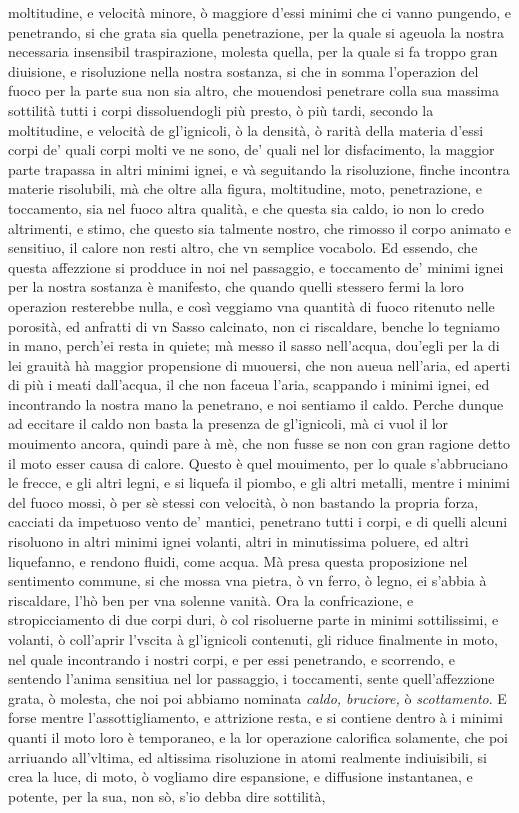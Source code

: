 \documentclass[11pt,twoside,openany]{book}
\begin{document}
moltitudine, e velocità minore, ò maggiore d'essi minimi che ci vanno pungendo, e penetrando, si che grata sia quella penetrazione, per la quale si ageuola la nostra necessaria insensibil traspirazione, molesta quella, per la quale si fa troppo gran diuisione, e risoluzione nella nostra sostanza, si che in somma l'operazion del fuoco per la parte sua non sia altro, che mouendosi penetrare colla sua massima sottilità tutti i corpi dissoluendogli più presto, ò più tardi, secondo la moltitudine, e velocità de gl'ignicoli, ò la densità, ò rarità della materia d'essi corpi de' quali corpi molti ve ne sono, de' quali nel lor disfacimento, la maggior parte trapassa in altri minimi ignei, e và seguitando la risoluzione, finche incontra materie risolubili, mà che oltre alla figura, moltitudine, moto, penetrazione, e toccamento, sia nel fuoco altra qualità, e che questa sia caldo, io non lo credo altrimenti, e stimo, che questo sia talmente nostro, che rimosso il corpo animato e sensitiuo, il calore non resti altro, che vn semplice vocabolo. Ed essendo, che questa affezzione si prodduce in noi nel passaggio, e toccamento de' minimi ignei per la nostra sostanza è manifesto, che quando quelli stessero fermi la loro operazion resterebbe nulla, e così veggiamo vna quantità di fuoco ritenuto nelle porosità, ed anfratti di vn Sasso calcinato, non ci riscaldare, benche lo tegniamo in mano, perch'ei resta in quiete; mà messo il sasso nell'acqua, dou'egli per la di lei grauità hà maggior propensione di muouersi, che non aueua nell'aria, ed aperti di più i meati dall'acqua, il che non faceua l'aria, scappando i minimi ignei, ed incontrando la nostra mano la penetrano, e noi sentiamo il caldo. Perche dunque ad eccitare il caldo non basta la presenza de gl'ignicoli, mà ci vuol il lor mouimento ancora, quindi pare à mè, che non fusse se non con gran ragione detto il moto esser causa di calore. Questo è quel mouimento, per lo quale s'abbruciano le frecce, e gli altri legni, e si liquefa il piombo, e gli altri metalli, mentre i minimi del fuoco mossi, ò per sè stessi con velocità, ò non bastando la propria forza, cacciati da impetuoso vento de' mantici, penetrano tutti i corpi, e di quelli alcuni risoluono in altri minimi ignei volanti, altri in minutissima poluere, ed altri liquefanno, e rendono fluidi, come acqua. Mà presa questa proposizione nel sentimento commune, si che mossa vna pietra, ò vn ferro, ò legno, ei s'abbia à riscaldare, l'hò ben per vna solenne vanità. Ora la confricazione, e stropicciamento di due corpi duri, ò col risoluerne parte in minimi sottilissimi, e volanti, ò coll'aprir l'vscita à gl'ignicoli contenuti, gli riduce finalmente in moto, nel quale incontrando i nostri corpi, e per essi penetrando, e scorrendo, e sentendo l'anima sensitiua nel lor passaggio, i toccamenti, sente quell'affezzione grata, ò molesta, che noi poi abbiamo nominata \textit{caldo, bruciore,} ò \textit{scottamento}. E forse mentre l'assottigliamento, e attrizione resta, e si contiene dentro à i minimi quanti il moto loro è temporaneo, e la lor operazione calorifica solamente, che poi arriuando all'vltima, ed altissima risoluzione in atomi realmente indiuisibili, si crea la luce, di moto, ò vogliamo dire espansione, e diffusione instantanea, e potente, per la sua, non sò, s'io debba dire sottilità, 
\end{document}

